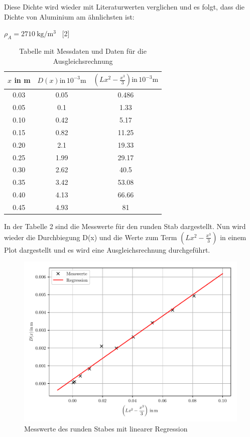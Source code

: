 Diese Dichte wird wieder mit Literaturwerten verglichen und es folgt, dass die Dichte
von Aluminium am ähnlichsten ist:\\
\centerline{$\rho_A = \SI[per-mode=fraction]{2710}{\kilo\gram\per\meter
\tothe{3}}$ \, [2]}

\begin{table}
  \centering
  \caption{Tabelle mit Messdaten und Daten für die Ausgleichsrechnung}
  \begin{tabular}{c c c}
  \toprule
  $x$ in \si{\meter} & $D(x) \text{in} \, 10^{-3}\si{\meter}$ & $\left(Lx^2-\frac{x^3}{3}\right) \text{in} \, 10^{-3}\si{\meter}$ \\
  \midrule
  0.03 & 0.05 &   0.486 \\
  0.05 & 0.1 & 1.33 \\
  0.10 & 0.42 &   5.17 \\
  0.15 & 0.82 &   11.25 \\
  0.20 & 2.1  & 19.33 \\
  0.25 & 1.99 &   29.17 \\
  0.30 & 2.62 &   40.5 \\
  0.35 & 3.42 &   53.08 \\
  0.40 & 4.13 &   66.66 \\
  0.45 & 4.93 &   81 \\
  \bottomrule
  \end{tabular}
\end{table}

In der Tabelle 2 sind die Messwerte für den runden Stab dargestellt. Nun wird wieder
die Durchbiegung D(x) und die Werte zum Term $\left(Lx^2-\frac{x^3}{3}\right)$ in
einem Plot dargestellt und es wird eine Ausgleichsrechnung durchgeführt.

\begin{figure}[H]
  \centering
  \includegraphics[width=\textwidth]{ausgleichsgerade2.pdf}
  \caption{Messwerte des runden Stabes mit linearer Regression}
\end{figure}

